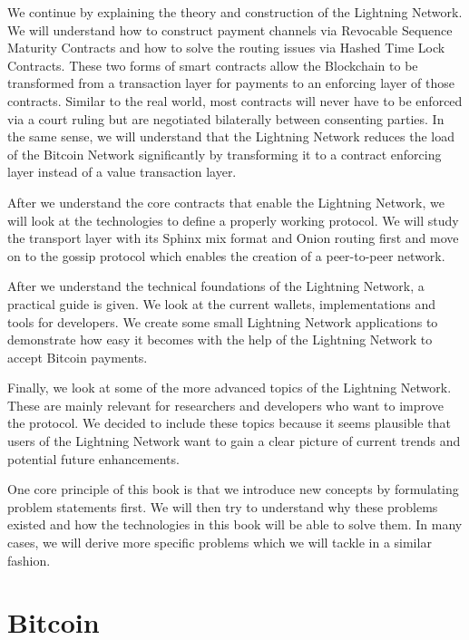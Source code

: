 \documentclass[a4paper,12pt,oneside,openany]{book}
\begin{document}
We continue by explaining the theory and construction of the Lightning Network.
We will understand how to construct payment channels via Revocable Sequence Maturity Contracts and how to solve the routing issues via Hashed Time Lock Contracts.
These two forms of smart contracts allow the Blockchain to be transformed from a transaction layer for payments to an enforcing layer of those contracts.
Similar to the real world, most contracts will never have to be enforced via a court ruling but are negotiated bilaterally between consenting parties.
In the same sense, we will understand that the Lightning Network reduces the load of the Bitcoin Network significantly by transforming it to a contract enforcing layer instead of a value transaction layer.

After we understand the core contracts that enable the Lightning Network, we will look at the technologies to define a properly working protocol.
We will study the transport layer with its Sphinx mix format and Onion routing first and move on to the gossip protocol which enables the creation of a peer-to-peer network.

After we understand the technical foundations of the Lightning Network, a practical guide is given.
We look at the current wallets, implementations and tools for developers.
We create some small Lightning Network applications to demonstrate how easy it becomes with the help of the Lightning Network to accept Bitcoin payments.

Finally, we look at some of the more advanced topics of the Lightning Network.
These are mainly relevant for researchers and developers who want to improve the protocol.
We decided to include these topics because it seems plausible that users of the Lightning Network want to gain a clear picture of current trends and potential future enhancements. 

One core principle of this book is that we introduce new concepts by formulating problem statements first. We will then try to understand why these problems existed and how the technologies in this book will be able to solve them. In many cases, we will derive more specific problems which we will tackle in a similar fashion.

\chapter{Bitcoin}
\end{document}

